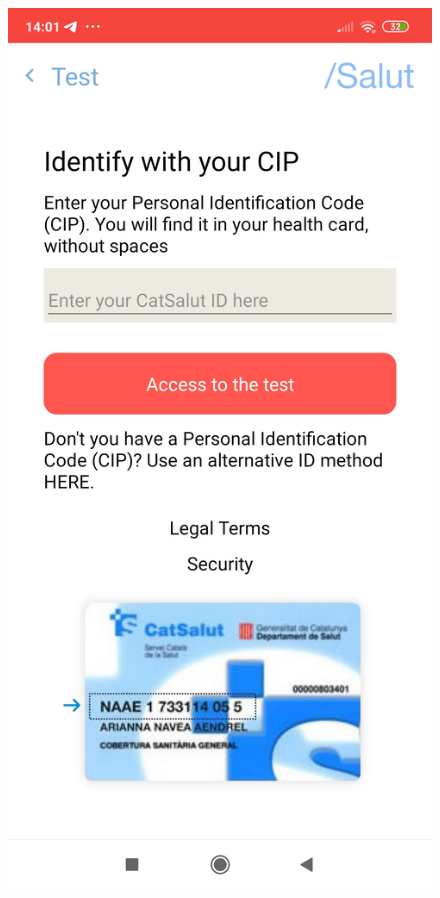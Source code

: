 \documentclass[a4paper, 12pt]{article}
\begin{document}
\begin{figure}[!htb]
   \begin{minipage}{0.33\textwidth}
     \centering
     \includegraphics[scale=0.06]{images/discussion/covid-cat-1.jpg}

\end{minipage}
\end{figure}
\end{document}
